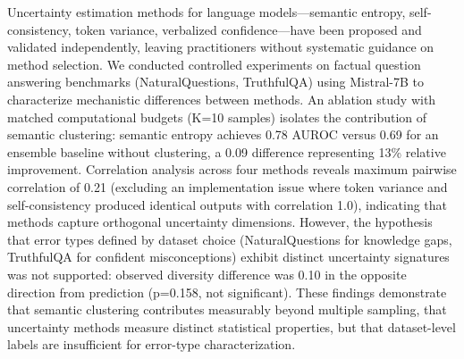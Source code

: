 
Uncertainty estimation methods for language models—semantic entropy, self-consistency, token variance, verbalized confidence—have been proposed and validated independently, leaving practitioners without systematic guidance on method selection. We conducted controlled experiments on factual question answering benchmarks (NaturalQuestions, TruthfulQA) using Mistral-7B to characterize mechanistic differences between methods. An ablation study with matched computational budgets (K=10 samples) isolates the contribution of semantic clustering: semantic entropy achieves 0.78 AUROC versus 0.69 for an ensemble baseline without clustering, a 0.09 difference representing 13\% relative improvement. Correlation analysis across four methods reveals maximum pairwise correlation of 0.21 (excluding an implementation issue where token variance and self-consistency produced identical outputs with correlation 1.0), indicating that methods capture orthogonal uncertainty dimensions. However, the hypothesis that error types defined by dataset choice (NaturalQuestions for knowledge gaps, TruthfulQA for confident misconceptions) exhibit distinct uncertainty signatures was not supported: observed diversity difference was 0.10 in the opposite direction from prediction (p=0.158, not significant). These findings demonstrate that semantic clustering contributes measurably beyond multiple sampling, that uncertainty methods measure distinct statistical properties, but that dataset-level labels are insufficient for error-type characterization.
